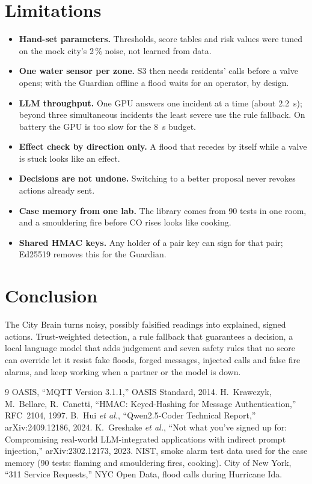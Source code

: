 \documentclass[conference]{IEEEtran}
\begin{document}
\section{Limitations}
\begin{itemize}
\item \textbf{Hand-set parameters.} Thresholds, score tables and risk values were tuned on the mock city's 2\,\% noise, not learned from data.
\item \textbf{One water sensor per zone.} S3 then needs residents' calls before a valve opens; with the Guardian offline a flood waits for an operator, by design.
\item \textbf{LLM throughput.} One GPU answers one incident at a time (about 2.2~s); beyond three simultaneous incidents the least severe use the rule fallback. On battery the GPU is too slow for the 8~s budget.
\item \textbf{Effect check by direction only.} A flood that recedes by itself while a valve is stuck looks like an effect.
\item \textbf{Decisions are not undone.} Switching to a better proposal never revokes actions already sent.
\item \textbf{Case memory from one lab.} The library comes from 90 tests in one room, and a smouldering fire before CO rises looks like cooking.
\item \textbf{Shared HMAC keys.} Any holder of a pair key can sign for that pair; Ed25519 removes this for the Guardian.
\end{itemize}

\section{Conclusion}
The City Brain turns noisy, possibly falsified readings into explained, signed actions. Trust-weighted detection, a rule fallback
that guarantees a decision, a local language model that adds judgement and seven safety rules that no score can override let it
resist fake floods, forged messages, injected calls and false fire alarms, and keep working when a partner or the model is down.

\begin{thebibliography}{9}
 OASIS, ``MQTT Version 3.1.1,'' OASIS Standard, 2014.
 H.~Krawczyk, M.~Bellare, R.~Canetti, ``HMAC: Keyed-Hashing for Message Authentication,'' RFC~2104, 1997.
 B.~Hui \emph{et al.}, ``Qwen2.5-Coder Technical Report,'' arXiv:2409.12186, 2024.
 K.~Greshake \emph{et al.}, ``Not what you've signed up for: Compromising real-world LLM-integrated applications with indirect prompt injection,'' arXiv:2302.12173, 2023.
 NIST, smoke alarm test data used for the case memory (90 tests: flaming and smouldering fires, cooking).
 City of New York, ``311 Service Requests,'' NYC Open Data, flood calls during Hurricane Ida.
\end{thebibliography}
\end{document}
